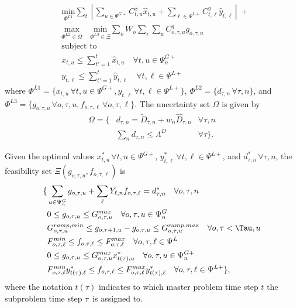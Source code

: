 \begin{align}
&\label{saro_obj} \underset{\Phi^{L1}}{\text{min}} \sum\limits_{t} \left[ \sum\limits_{u \in \Psi^{G+}} C^x_{t, u} \hat{x}_{t, u} + \sum\limits_{\ell \in \Psi^{L+}} C^y_{t, \ell} \hat{y}_{t, \ell} \right] +  \\
&\underset{\Phi^{L2} \in \Omega}{\text{max}} \quad \underset{\Phi^{L3} \in \Xi}{\text{min}} \sum\limits_o W_o \sum\limits_{\tau} \sum\limits_{u} C^g_{o, \tau, u} g_{o, \tau, u} \\
&\text{subject to} \nonumber \\
&\label{master_constraint_first} x_{t, u} \leq \sum\limits_{t' = 1}^{t} \hat{x}_{t, u} 	\quad \forall t, u \in \Psi_n^{G+} \\
&\label{master_constraint_last} y_{t, \ell} \leq \sum\limits_{t' = 1}^{t} \hat{y}_{t, \ell} 	\quad \forall t, \ell \in \Psi^{L+}
\end{align}
where $\Phi^{L1} = \{ x_{t, u} \, \forall t, u \in  \Psi^{G+}, y_{t, \ell} \, \forall t, \ell \in  \Psi^{L+} \}$, $\Phi^{L2} = \{ d_{\tau, n} \, \forall \tau, n \}$, and $\Phi^{L3} = \{ g_{o, \tau, u} \, \forall o, \tau, u, f_{o, \tau, \ell} \, \forall o, \tau, \ell \}$. The uncertainty set $\Omega$ is given by
\begin{align}
\Omega = \{ &d_{\tau, n} = \tilde{D}_{\tau, n} + w_n \hat{D}_{\tau, n} & \forall \tau, n \nonumber \\
\label{uncertainty_set}&\sum\limits_n d_{\tau, n} \leq \Lambda^D & \forall \tau \}.
\end{align}

Given the optimal values $x_{t, u}^* \, \forall t, u \in \Psi^{G+}$, $y_{t, \ell}^* \, \forall t, \ell \in \Psi^{L+}$, and $d_{\tau, n}^* \, \forall \tau, n$, the feasibility set $\Xi(g_{o, \tau, u}, f_{o, \tau, \ell})$ is
\begin{align}
\{ &\sum\limits_{u \in \Psi^G_{n}} g_{o, \tau, u} + \sum\limits_{\ell} Y_{\ell, n} f_{o, \tau, \ell} = d_{\tau, n}^* \quad \forall o, \tau, n\\
&0 \leq g_{o, \tau, u} \leq G_{o, \tau, u}^{max} \quad \forall o, \tau, u \in \Psi_n^G \\
&G^{ramp,min}_{o, \tau, u} \leq g_{o, \tau + 1, u} - g_{o, \tau, u} \leq G^{ramp,max}_{o, \tau, u} 	\quad \forall o, \tau < \Tau, u \\
&F_{o, \tau, \ell}^{min} \leq f_{o, \tau, \ell} \leq F_{o, \tau, \ell}^{max} \quad \forall o, \tau, \ell \in \Psi^L \\
&0 \leq g_{o, \tau, u} \leq G_{o, \tau, u}^{max} x_{t(\tau), u}^* \quad \forall o, \tau, u \in \Psi_n^{G+} \\
&F_{o, \tau, \ell}^{min} y_{t(\tau), \ell}^* \leq f_{o, \tau, \ell} \leq F_{o, \tau, \ell}^{max} y_{t(\tau), \ell}^* \quad \forall o, \tau, \ell \in \Psi^{L+} \},
\end{align}
where the notation $t(\tau)$ indicates to which master problem time step $t$ the subproblem time step $\tau$ is assigned to.

